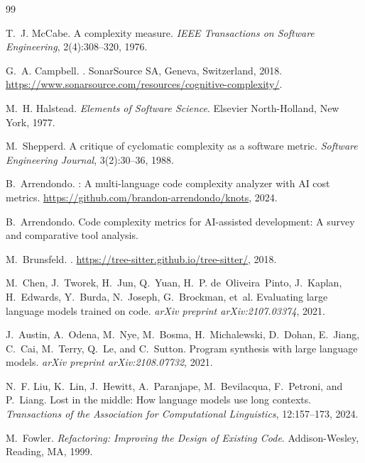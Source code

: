 \documentclass[10pt,twocolumn,letterpaper]{article}
\begin{document}
\begin{thebibliography}{99}

T.~J. McCabe.
\newblock A complexity measure.
\newblock \emph{IEEE Transactions on Software Engineering}, 2(4):308--320,
  1976.

G.~A. Campbell.
.
\newblock SonarSource SA, Geneva, Switzerland, 2018.
\newblock \url{https://www.sonarsource.com/resources/cognitive-complexity/}.

M.~H. Halstead.
\newblock \emph{Elements of Software Science}.
\newblock Elsevier North-Holland, New York, 1977.

M.~Shepperd.
\newblock A critique of cyclomatic complexity as a software metric.
\newblock \emph{Software Engineering Journal}, 3(2):30--36, 1988.

B.~Arrendondo.
: A multi-language code complexity analyzer with AI cost
  metrics.
\newblock \url{https://github.com/brandon-arrendondo/knots}, 2024.

B.~Arrendondo.
\newblock Code complexity metrics for AI-assisted development: A survey and
  comparative tool analysis.
\newblock %

M.~Brunsfeld.
.
\newblock \url{https://tree-sitter.github.io/tree-sitter/}, 2018.

M.~Chen, J.~Tworek, H.~Jun, Q.~Yuan, H.~P. de~Oliveira~Pinto, J.~Kaplan,
  H.~Edwards, Y.~Burda, N.~Joseph, G.~Brockman, et~al.
\newblock Evaluating large language models trained on code.
\newblock \emph{arXiv preprint arXiv:2107.03374}, 2021.

J.~Austin, A.~Odena, M.~Nye, M.~Bosma, H.~Michalewski, D.~Dohan, E.~Jiang,
  C.~Cai, M.~Terry, Q.~Le, and C.~Sutton.
\newblock Program synthesis with large language models.
\newblock \emph{arXiv preprint arXiv:2108.07732}, 2021.

N.~F. Liu, K.~Lin, J.~Hewitt, A.~Paranjape, M.~Bevilacqua, F.~Petroni, and
  P.~Liang.
\newblock Lost in the middle: How language models use long contexts.
\newblock \emph{Transactions of the Association for Computational Linguistics},
  12:157--173, 2024.

M.~Fowler.
\newblock \emph{Refactoring: Improving the Design of Existing Code}.
\newblock Addison-Wesley, Reading, MA, 1999.


\end{thebibliography}
\end{document}
